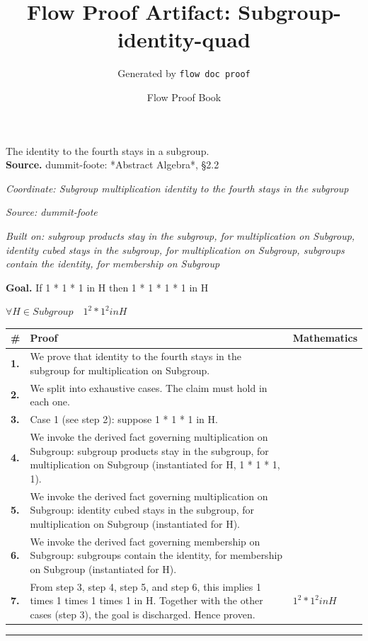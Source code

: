 \documentclass[11pt]{article}
\title{Flow Proof Artifact: Subgroup-identity-quad}
\author{Generated by \texttt{flow doc proof}}
\date{Flow Proof Book}
\theoremstyle{definition}
\begin{document}
\maketitle
The identity to the fourth stays in a subgroup.\\[0.5em]
\textbf{Source.} dummit-foote: *Abstract Algebra*, §2.2\\[0.5em]
\bigskip
{}\par
\smallskip\noindent\textit{Coordinate: Subgroup \cdot multiplication \cdot identity to the fourth stays in the subgroup}\par
\smallskip\noindent\textit{Source: dummit-foote}\par
\smallskip\noindent\textit{Built on: subgroup products stay in the subgroup, for multiplication on Subgroup, identity cubed stays in the subgroup, for multiplication on Subgroup, subgroups contain the identity, for membership on Subgroup}\par
\medskip
\noindent\textbf{Goal.} If 1 * 1 * 1 in H then 1 * 1 * 1 * 1 in H\par
\noindent$\displaystyle \forall H \in Subgroup\quad 1^{2} * 1^{2} in H$\par
\medskip
\noindent
\begin{tabular}{@{} >{\raggedright\arraybackslash}p{} >{\raggedright\arraybackslash}p{} >{\raggedleft\arraybackslash}p{} @{}}
\textbf{\#} & \textbf{Proof} & \textbf{Mathematics} \\
\midrule
\textbf{1.} & We prove that identity to the fourth stays in the subgroup for multiplication on Subgroup. & \\[0.45em]
\textbf{2.} & We split into exhaustive cases. The claim must hold in each one. & \\[0.45em]
\textbf{3.} & Case 1 (see step 2): suppose 1 * 1 * 1 in H. & \\[0.45em]
\textbf{4.} & We invoke the derived fact governing multiplication on Subgroup: subgroup products stay in the subgroup, for multiplication on Subgroup (instantiated for H, 1 * 1 * 1, 1). & \\[0.45em]
\textbf{5.} & We invoke the derived fact governing multiplication on Subgroup: identity cubed stays in the subgroup, for multiplication on Subgroup (instantiated for H). & \\[0.45em]
\textbf{6.} & We invoke the derived fact governing membership on Subgroup: subgroups contain the identity, for membership on Subgroup (instantiated for H). & \\[0.45em]
\textbf{7.} & From step 3, step 4, step 5, and step 6, this implies 1 times 1 times 1 times 1 in H. Together with the other cases (step 3), the goal is discharged. Hence proven. & $\displaystyle 1^{2} * 1^{2} in H$ \\[0.45em]
\bottomrule
\end{tabular}
\label{thm:Subgroup-multiplication-identity_to_the_fourth_stays_in_the_subgroup}
\par\medskip\hrule
\end{document}
